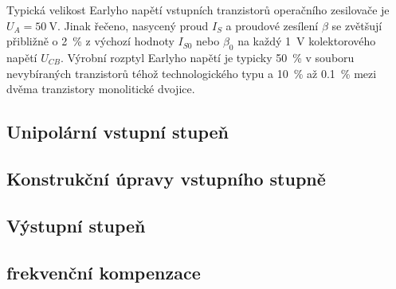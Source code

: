         Typická velikost Earlyho napětí vstupních tranzistorů operačního zesilovače je \(U_A=
        \qty{50}{\V}\). Jinak řečeno, nasycený proud \(I_S\) a proudové zesílení \(\beta\) se
        zvětšují přibližně o \qty{2}{\percent} z výchozí hodnoty \(I_{S0}\) nebo \(\beta_0\) na každý
        \qty{1}{\V} kolektorového napětí \(U_{CB}\). Výrobní rozptyl Earlyho napětí je typicky
        \qty{50}{\percent} v souboru nevybíraných tranzistorů téhož technologického typu a
        \qty{10}{\percent} až \qty{0.1}{\percent} mezi dvěma tranzistory monolitické dvojice.

    \subsection{Unipolární vstupní stupeň}\label{aesIchIIIsecIIIssecII}
    \subsection{Konstrukční úpravy vstupního stupně}\label{aesIchIIIsecIIIssecIII}
    \subsection{Výstupní stupeň}\label{aesIchIIIsecIIIssecIV}
    \subsection{frekvenční kompenzace}\label{aesIchIIIsecIIIssecV}

